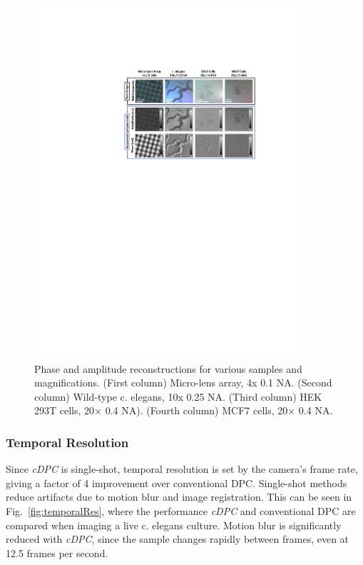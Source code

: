 \begin{figure}[ph]
\centering
\includegraphics[width=0.9\textwidth]{figures/fig_cdpc_video.pdf}
\caption{\label{fig:mosaic}
Phase and amplitude reconstructions for various samples and magnifications. (First column) Micro-lens array, 4x 0.1 NA. (Second column) Wild-type c. elegans, 10x 0.25 NA. (Third column) HEK 293T cells, 20$\times$ 0.4 NA). (Fourth column) MCF7 cells, 20$\times$ 0.4 NA.}
\end{figure}

\clearpage

\subsubsection{Temporal Resolution}
Since \textit{cDPC} is single-shot, temporal resolution is set by the camera's frame rate, giving a factor of 4 improvement over conventional DPC. Single-shot methods reduce artifacts due to motion blur and image registration. This can be seen in Fig.~\ref{fig:temporalRes}, where the performance \textit{cDPC} and conventional DPC are compared when imaging a live c. elegans culture. Motion blur is significantly reduced with \textit{cDPC}, since the sample changes rapidly between frames, even at 12.5 frames per second.

